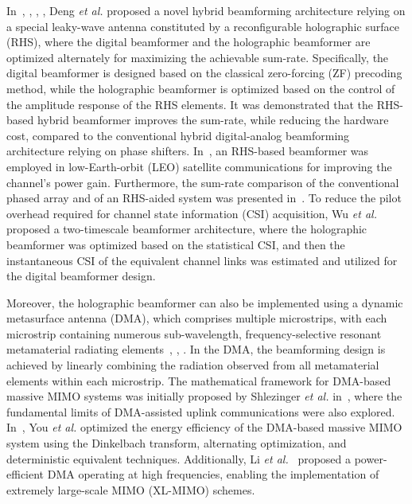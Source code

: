 In~\cite{deng2021reconfigurable_tvt}, \cite{deng2022hdma}, \cite{deng2022reconfigurable_twc}, \cite{hu2022holographic}, Deng \textit{et al.} proposed a novel hybrid beamforming architecture relying on a special leaky-wave antenna constituted by a reconfigurable holographic surface (RHS), where the digital beamformer and the holographic beamformer are optimized alternately for maximizing the achievable sum-rate. Specifically, the digital beamformer is designed based on the classical zero-forcing (ZF) precoding method, while the holographic beamformer is optimized based on the control of the amplitude response of the RHS elements. It was demonstrated that the RHS-based hybrid beamformer improves the sum-rate, while reducing the hardware cost, compared to the conventional hybrid digital-analog beamforming architecture relying on phase shifters. In~\cite{deng2022holographic}, an RHS-based beamformer was employed in low-Earth-orbit (LEO) satellite communications for improving the channel's power gain. Furthermore, the sum-rate comparison of the conventional phased array and of an RHS-aided system was presented in~\cite{hu2023holographic}. To reduce the pilot overhead required for channel state information (CSI) acquisition, Wu \textit{et al.}~\cite{wu2024two} proposed a two-timescale beamformer architecture, where the holographic beamformer was optimized based on the statistical CSI, and then the instantaneous CSI of the equivalent channel links was estimated and utilized for the digital beamformer design.

Moreover, the holographic beamformer can also be implemented using a dynamic metasurface antenna (DMA), which comprises multiple microstrips, with each microstrip containing numerous sub-wavelength, frequency-selective resonant metamaterial radiating elements~\cite{shlezinger2019dynamic}, \cite{you2022energy}, \cite{li2023near}. In the DMA, the beamforming design is achieved by linearly combining the radiation observed from all metamaterial elements within each microstrip. The mathematical framework for DMA-based massive MIMO systems was initially proposed by Shlezinger \textit{et al.} in~\cite{shlezinger2019dynamic}, where the fundamental limits of DMA-assisted uplink communications were also explored. In~\cite{you2022energy}, You \textit{et al.} optimized the energy efficiency of the DMA-based massive MIMO system using the Dinkelbach transform, alternating optimization, and deterministic equivalent techniques. Additionally, Li \textit{et al.}~\cite{li2023near} proposed a power-efficient DMA operating at high frequencies, enabling the implementation of extremely large-scale MIMO (XL-MIMO) schemes.

